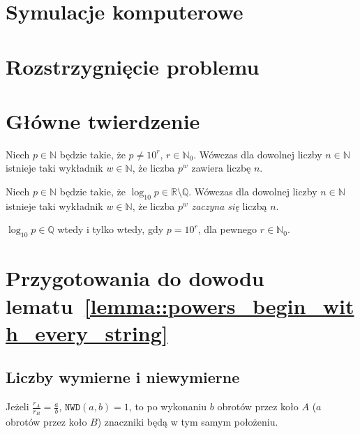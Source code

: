 \documentclass[aspectratio=169]{beamer}
\newcommand{\R}{\mathbb{R}}
\newcommand{\Q}{\mathbb{Q}}
\newcommand{\N}{\mathbb{N}}
\renewcommand{\gcd}[2]{\mathtt{NWD}\paren{#1, #2}}
\newcommand{\labelOnSlide}[2]{\label<#1>{#2}}
\newcommand{\define}[1]{\textcolor{colorOfDefinition}{\textit{#1}}}
\newcommand{\paren}[1]{\!\left(#1 \right)}
\newcommand{\goToProof}[1]{\hfill\hyperlink{#1}{\normalfont\faArrowCircleRight}}
\begin{document}
\section{Symulacje komputerowe}

{\expSubstrPlotsTex}

\section{Rozstrzygnięcie problemu}
\section{Główne twierdzenie}

\begin{frame}
  \pause{}
  \begin{theorem}
    Niech $p \in \N$ będzie takie, że $p \not = 10^r$, $r \in \N_0$.
    Wówczas dla dowolnej liczby $n \in \N$ istnieje taki wykładnik $w \in \N$, że liczba $p^w$ zawiera liczbę $n$.
  \end{theorem}
  \pause{}
  \begin{lemma}
    \labelOnSlide{4}{lemma::powers_begin_with_every_string}
    Niech $p \in \N$ będzie takie, że $\log_{10}p \in \R \setminus \Q$.
    Wówczas dla dowolnej liczby $n \in \N$ istnieje taki wykładnik $w \in \N$, że liczba $p^w$ \define{zaczyna się} liczbą $n$. \goToProof{proof::lemma::powers_begin_with_every_string}
  \end{lemma}
  \pause{}
  \begin{lemma}
    \labelOnSlide{4}{lemma::log_10_rational_iff}
    $\log_{10}p \in \Q$ wtedy i tylko wtedy, gdy $p = 10^r$, dla pewnego $r \in \N_0$.
    \goToProof{proof::lemma::log_10_rational_iff}
  \end{lemma}
\end{frame}

\section{\texorpdfstring{Przygotowania do dowodu lematu~\protect\ref{lemma::powers_begin_with_every_string}}{Przygotowania do dowodu głównego lematu}}
\subsection{Liczby wymierne i niewymierne}

\begin{frame}
  \begin{figure}
    {\wheelsRationalTex}
  \end{figure}
  \begin{theorem}
  Jeżeli $\frac{r_A}{r_B} = \frac{a}{b}$, $\gcd{a}{b} = 1$, to po wykonaniu $b$ obrotów przez koło $A$ ($a$ obrotów przez koło $B$)
  \textcolor{\wheelMarkerColor}{znaczniki} będą w tym samym położeniu.
  \end{theorem}
\end{frame}
\end{document}
